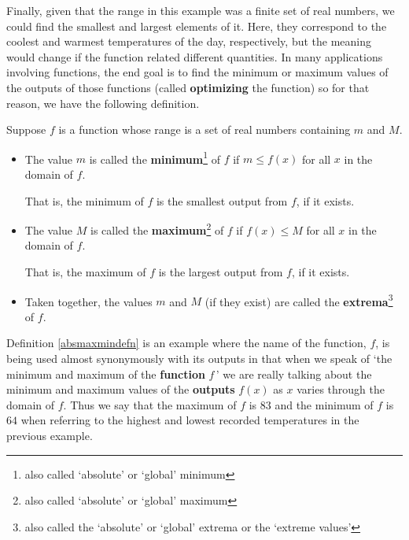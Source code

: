 \documentclass{ximera}
\begin{document}
\medskip

Finally, given that the range in this example was a finite set of real numbers, we could find the smallest and largest elements of it.  Here, they correspond to the coolest and warmest temperatures of the day, respectively, but the meaning would change if the function related different quantities.  In many applications involving functions, the end goal is to find the minimum or maximum values of the outputs of those functions (called \textbf{optimizing} the function) so for that reason, we have the following definition.  

\medskip

\colorbox{ResultColor}{\bbm

\begin{defn}

\label{absmaxmindefn}

Suppose $f$ is a function whose range is a set of real numbers containing $m$ and $M$.

\begin{itemize}

\item  The value $m$ is called the \textbf{minimum}\footnote{also called `absolute' or `global' minimum} of $f$ if $m \leq f(x)$ for all $x$ in the domain of $f$. 

That is, the minimum of $f$ is the smallest output from $f$, if it exists.

\item  The value $M$ is called the \textbf{maximum}\footnote{also called `absolute' or `global' maximum}  of $f$ if $f(x) \leq M$ for all $x$ in the domain of $f$. 

That is, the maximum of $f$ is the largest output from $f$, if it exists.

\item  Taken together, the values $m$ and $M$ (if they exist) are called the \textbf{extrema}\footnote{also called the `absolute' or `global' extrema or the `extreme values'} of $f$.

\end{itemize}

\end{defn}

\ebm}

\medskip

Definition \ref{absmaxmindefn} is an example where the name of the function, $f$, is being used almost synonymously with its outputs in that when we speak of `the minimum and maximum of the \textbf{function} $f\,$' we are really talking about the minimum and maximum values of the \textbf{outputs} $f(x)$ as $x$ varies through the domain of $f$.  Thus we say that the  maximum of $f$ is $83$ and the  minimum of $f$ is $64$ when referring to the highest and lowest recorded temperatures in the previous example.  
\end{document}
